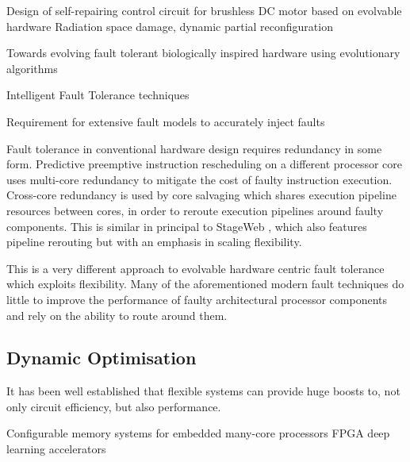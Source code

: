 \todo Design of self-repairing control circuit for brushless DC motor based on evolvable hardware\cite{8046381}
Radiation space damage, dynamic partial reconfiguration

\todo Towards evolving fault tolerant biologically inspired hardware using evolutionary algorithms

\todo Intelligent Fault Tolerance techniques

\todo Requirement for extensive fault models to accurately inject faults

Fault tolerance in conventional hardware design requires redundancy in some
form. Predictive preemptive instruction rescheduling on a different processor
core \cite{Soman} uses multi-core redundancy to mitigate the cost of faulty instruction
execution. Cross-core redundancy is used by core salvaging \cite{Powell} which shares execution
pipeline resources between cores, in order to reroute execution pipelines
around faulty components. This is similar in principal to StageWeb \cite{StageWeb}, which also
features pipeline rerouting but with an emphasis in scaling flexibility.

This is a very different approach to evolvable hardware centric fault
tolerance which exploits flexibility. Many of the aforementioned modern
fault techniques do little to improve the performance of faulty architectural
processor components and rely on the ability to route around them.

\subsection{Dynamic Optimisation}
It has been well established that flexible systems can provide huge boosts to,
not only circuit efficiency, but also performance.

\todo Configurable memory systems for embedded many-core processors\cite{DBLP:journals/corr/BatesCM16}
\todo FPGA deep learning accelerators
